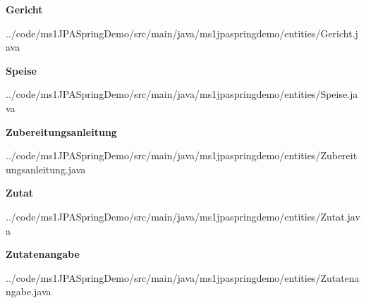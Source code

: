 \begin{mdframed}[style=codebox]
\textbf{Gericht}

{../code/ms1JPASpringDemo/src/main/java/ms1jpaspringdemo/entities/Gericht.java}
\end{mdframed}
\begin{mdframed}[style=codebox]
\textbf{Speise}

{../code/ms1JPASpringDemo/src/main/java/ms1jpaspringdemo/entities/Speise.java}
\end{mdframed}
\begin{mdframed}[style=codebox]
\textbf{Zubereitungsanleitung}

{../code/ms1JPASpringDemo/src/main/java/ms1jpaspringdemo/entities/Zubereitungsanleitung.java}
\end{mdframed}
\begin{mdframed}[style=codebox]
\textbf{Zutat}

{../code/ms1JPASpringDemo/src/main/java/ms1jpaspringdemo/entities/Zutat.java}
\end{mdframed}
\begin{mdframed}[style=codebox]
\textbf{Zutatenangabe}

{../code/ms1JPASpringDemo/src/main/java/ms1jpaspringdemo/entities/Zutatenangabe.java}
\end{mdframed}
